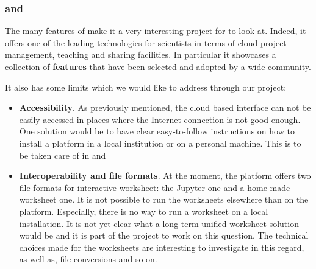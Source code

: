 \documentclass{deliverablereport}
\begin{document}
\subsubsection{\SMC and \ODK}

The many features of \SMC make it a very interesting project for \ODK
to look at. Indeed, it offers one of the leading technologies for
scientists in terms of cloud project management, teaching and sharing
facilities. In particular it showcases a collection of
\textbf{features} that have been selected and adopted by a wide
community.

It also has some limits which we would like to address through our
project:
\begin{itemize}
\item \textbf{Accessibility}. As previously mentioned, the cloud based
  interface can not be easily accessed in places where the Internet
  connection is not good enough. One solution would be to have clear
  easy-to-follow instructions on how to install a \SMC platform in a
  local institution or on a personal machine. This is to be taken care of in
  and 

\item \textbf{Interoperability and file formats}. At the moment, the
  \SMC platform offers two file formats for interactive worksheet: the
  Jupyter one and a home-made \Sage worksheet one. It is not possible
  to run the \Sage worksheets elsewhere than on the
  platform. Especially, there is no way to run a \Sage worksheet on a
  local \Sage installation. It is not yet clear what a long term
  unified worksheet solution would be and it is part of the \ODK
  project to work on this question. The technical choices made for the
  \Sage worksheets are interesting to investigate in this regard, as
  well as, file conversions and so on.
\end{itemize}
\end{document}
